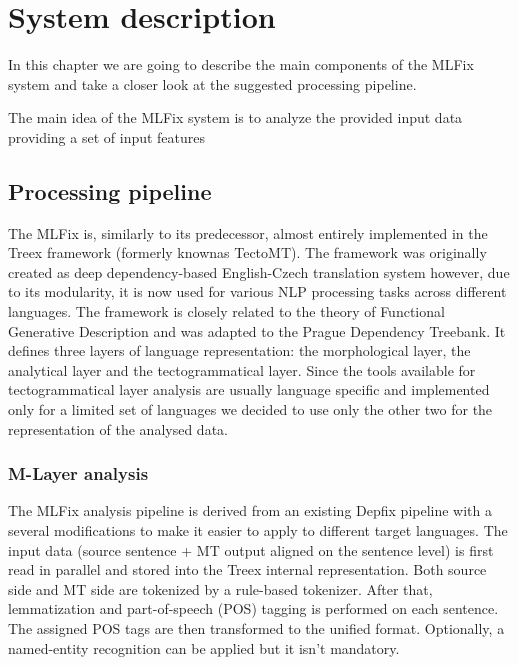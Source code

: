 \chapter{System description}

In this chapter we are going to describe the main components
of the MLFix system and take a closer look at the suggested processing pipeline.

The main idea of the MLFix system is to analyze the provided input data providing
a set of input features 

\section{Processing pipeline}

The MLFix is, similarly to its predecessor, almost entirely implemented in the
Treex\cite{Popel:2010:TMN:1884371.1884406}
framework (formerly knownas TectoMT). The framework was
originally created as deep dependency-based English-Czech
translation system however, due to its modularity, it is
now used for various NLP processing tasks across different
languages. The framework is closely related to the theory of Functional Generative Description\cite{Sgall1967}
and was adapted to the Prague Dependency Treebank\cite{pdt20:2006}.
It defines three layers of language representation: the morphological layer, the analytical layer
and the tectogrammatical layer.
Since the tools available for tectogrammatical layer analysis are usually
language specific and implemented only for a limited set of languages
we decided to use only the other two for the representation
of the analysed data.

\subsection{M-Layer analysis}

The MLFix analysis pipeline is derived from an existing Depfix pipeline
with a several modifications to make it easier to apply to different
target languages. The input data (source sentence + MT output aligned on the sentence level)
is first read in parallel and stored into the Treex internal representation.
Both source side and MT side are tokenized by a rule-based tokenizer. After
that, lemmatization and part-of-speech (POS) tagging is performed on each sentence. The
assigned POS tags are then transformed to the unified format. Optionally,
a named-entity recognition can be applied but it isn't mandatory.

